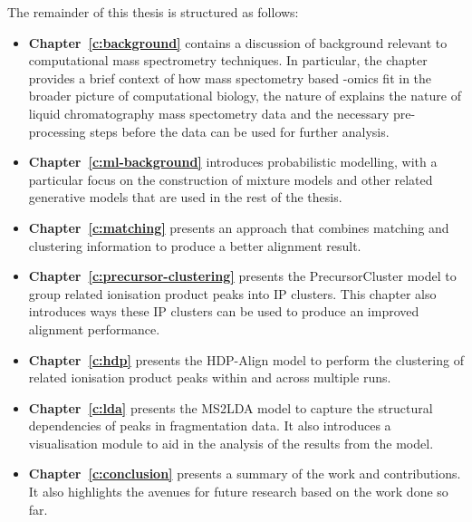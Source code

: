 The remainder of this thesis is structured as follows:

\begin{itemize}
\item \textbf{Chapter~\ref{c:background}} contains a discussion of background relevant to computational mass spectrometry techniques. In particular, the chapter provides a brief context of how mass spectometry based -omics fit in the broader picture of computational biology, the nature of explains the nature of liquid chromatography mass spectometry data and the necessary pre-processing steps before the data can be used for further analysis.
\item \textbf{Chapter~\ref{c:ml-background}} introduces probabilistic modelling, with a particular focus on the construction of mixture models and other related generative models that are used in the rest of the thesis.
\item \textbf{Chapter~\ref{c:matching}} presents an approach that combines matching and clustering information to produce a better alignment result.
\item \textbf{Chapter~\ref{c:precursor-clustering}} presents the PrecursorCluster model to group related ionisation product peaks into IP clusters. This chapter also introduces ways these IP clusters can be used to produce an improved alignment performance.
\item \textbf{Chapter~\ref{c:hdp}} presents the HDP-Align model to perform the clustering of related ionisation product peaks within and across multiple runs. 
\item \textbf{Chapter~\ref{c:lda}} presents the MS2LDA model to capture the structural dependencies of peaks in fragmentation data. It also introduces a visualisation module to aid in the analysis of the results from the model. 
\item \textbf{Chapter~\ref{c:conclusion}} presents a summary of the work and contributions. It also highlights the avenues for future research based on the work done so far. 
\end{itemize}